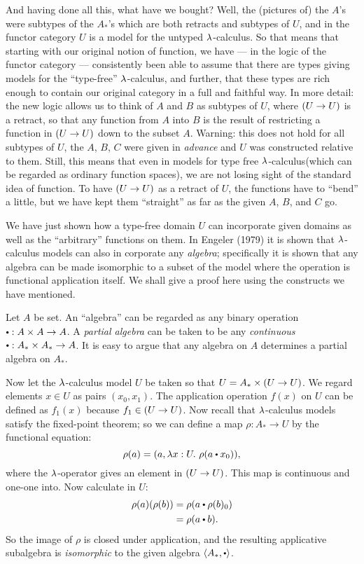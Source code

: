 And having done all this, what have we bought? Well, the (pictures of) the $A$'s were
subtypes of the $A_*$'s which are both retracts and subtypes of $U$, and in the functor
category $U$ is a model for the untyped $\lambda$-calculus. So that means that starting with
our original notion of function, we have --- in the logic of the functor category ---
consistently been able to assume that there are types giving models for the ``type-free''
$\lambda$-calculus, and further, that these types are rich enough to contain our original
category in a full and faithful way. In more detail: the new logic allows us to think of
$A$ and $B$ as subtypes of $U$, where $(U\rightarrow U)$ is a retract, so that any function from $A$
into $B$ is the result of restricting a function in $(U\rightarrow U)$ down to the subset $A$. Warning:
this does not hold for all subtypes of $U$, the $A$, $B$, $C$ were given in {\it advance}
and $U$ was constructed relative to them. Still, this means that even in models for type
free $\lambda$-calculus(which can be regarded as ordinary function spaces), we are not losing
sight of the standard idea of function. To have $(U\rightarrow U)$ as a retract of $U$, the functions
have to ``bend'' a little, but we have kept them ``straight'' as far as the given $A$,
$B$, and $C$ go.

We have just shown how a type-free domain $U$ can incorporate given domains as well as the
``arbitrary'' functions on them. In Engeler (1979) it is shown that $\lambda$-calculus models
can also in corporate any {\it algebra}; specifically it is shown that any algebra can be
made isomorphic to a subset of the model where the operation is functional application
itself. We shall give a proof here using the constructs we have mentioned.

Let $A$ be set. An ``algebra'' can be regarded as any binary operation $\dotop :  A\times
A\to A$. A {\it partial algebra} can be taken to be any {\it continuous} $\dotop : A_* \times A_* \to
A$. It is easy to argue that any algebra on $A$ determines a partial algebra on $A_*$.

Now let the $\lambda$-calculus model $U$ be taken so that $U = A_* \times  (U\rightarrow U)$. We regard
elements $x \in U$ as pairs $(x_0 , x_1 )$. The application operation $f(x)$ on $U$ can be
defined as $f_1(x)$ because $f_1 \in (U\rightarrow U)$. Now recall that $\lambda$-calculus models satisfy
the fixed-point theorem; so we can define a map $\rho: A_*\to U$ by the functional
equation:
$$
\rho(a)  =  (a, \l x: U. \,\,\rho (a \dotop x_0)) ,
$$
where the $\lambda$-operator gives an element in $(U\rightarrow U)$. This map is continuous and one-one
into. Now calculate in $U$:
\begin{align*}
\rho(a)(\rho(b)) &= \rho(a\dotop \rho(b)_0)\\
&= \rho( a  \dotop  b) .
\end{align*}
So the image of $\rho$ is closed under application, and the resulting applicative
subalgebra is {\it isomorphic} to the given algebra $\langle A_*, \dotop \rangle$.

